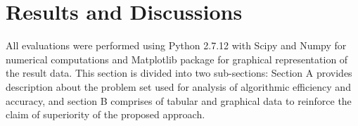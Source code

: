 \documentclass[a4paper,twoside]{article}
\begin{document}


%


%





\section{Results and Discussions}

All evaluations were performed using Python 2.7.12 with Scipy\cite{oliphant2007python} and Numpy\cite{van2011numpy} for numerical computations and Matplotlib \cite{Hunter:2007} package for graphical representation of the result data. This section is divided into two sub-sections: Section A provides description about the problem set used for analysis of algorithmic efficiency and accuracy, and section B comprises of tabular and graphical data to reinforce the claim of superiority of the proposed approach.
\end{document}
